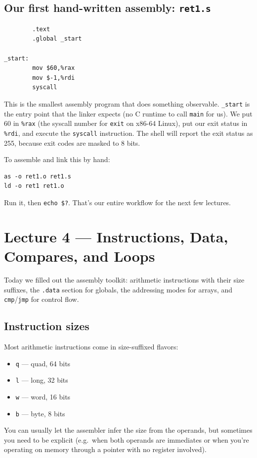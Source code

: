 \documentclass[11pt]{article}
\begin{document}
\subsection*{Our first hand-written assembly: \texttt{ret1.s}}

\begin{lstlisting}
        .text
        .global _start

_start:
        mov $60,%rax
        mov $-1,%rdi
        syscall
\end{lstlisting}

This is the smallest assembly program that does something
observable. \texttt{\_start} is the entry point that the linker
expects (no C runtime to call \texttt{main} for us). We put 60 in
\texttt{\%rax} (the syscall number for \texttt{exit} on x86-64
Linux), put our exit status in \texttt{\%rdi}, and execute the
\texttt{syscall} instruction. The shell will report the exit status
as 255, because exit codes are masked to 8 bits.

To assemble and link this by hand:
\begin{lstlisting}
as -o ret1.o ret1.s
ld -o ret1 ret1.o
\end{lstlisting}
Run it, then \texttt{echo \$?}. That's our entire workflow for the
next few lectures.

\section{Lecture 4 --- Instructions, Data, Compares, and Loops}

Today we filled out the assembly toolkit: arithmetic instructions
with their size suffixes, the \texttt{.data} section for globals,
the addressing modes for arrays, and \texttt{cmp}/\texttt{jmp} for
control flow.

\subsection*{Instruction sizes}

Most arithmetic instructions come in size-suffixed flavors:
\begin{itemize}
  \item \texttt{q} --- quad, 64 bits
  \item \texttt{l} --- long, 32 bits
  \item \texttt{w} --- word, 16 bits
  \item \texttt{b} --- byte, 8 bits
\end{itemize}
You can usually let the assembler infer the size from the operands,
but sometimes you need to be explicit (e.g.\ when both operands are
immediates or when you're operating on memory through a pointer with
no register involved).
\end{document}

